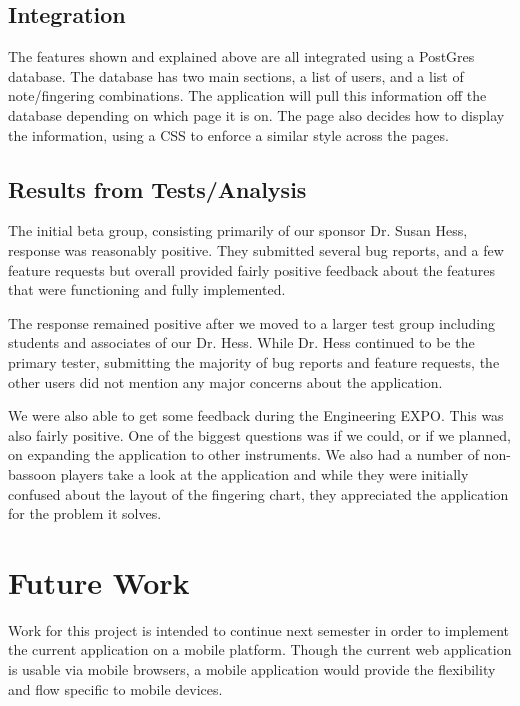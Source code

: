 \documentclass[12pt,english]{article}
\begin{document}
\subsection{Integration}
The features shown and explained above are all integrated using a PostGres
database. The database has two main sections, a list of users, and a list of
note/fingering combinations. The application will pull this information off
the database depending on which page it is on. The page also decides how to
display the information, using a CSS to enforce a similar style across the
pages. 

\subsection{Results from Tests/Analysis}

The initial beta group, consisting primarily of our sponsor Dr. Susan
Hess, response was reasonably positive. They submitted several bug
reports, and a few feature requests but overall provided fairly positive
feedback about the features that were functioning and fully implemented.

The response remained positive after we moved to a larger test group
including students and associates of our Dr. Hess. While Dr. Hess
continued to be the primary tester, submitting the majority of bug
reports and feature requests, the other users did not mention any
major concerns about the application.

We were also able to get some feedback during the Engineering EXPO.
This was also fairly positive. One of the biggest questions was if
we could, or if we planned, on expanding the application to other
instruments. We also had a number of non-bassoon players take a look
at the application and while they were initially confused about the
layout of the fingering chart, they appreciated the application for
the problem it solves.

\clearpage
\section{Future Work}

Work for this project is intended to continue next semester in order
to implement the current application on a mobile platform. Though
the current web application is usable via mobile browsers, a mobile
application would provide the flexibility and flow specific to mobile
devices.
\end{document}
